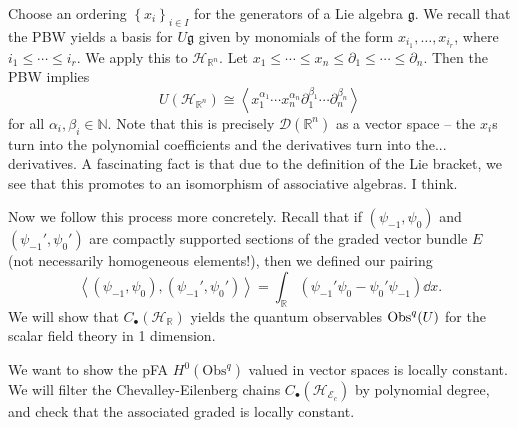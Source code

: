 Choose an ordering $\left\{ x_i \right\} _{i\in I} $ for the generators of a Lie algebra $\mathfrak{g} $. We recall that the PBW yields a basis for $U\mathfrak{g} $ given by monomials of the form $x_{i_1} ,\ldots ,x_{i_r} $, where $i_{1} \leq \cdots \leq i_{r} $. We apply this to $\mathcal{H} _{\mathbb{R} ^n} $. Let $x_1 \leq \cdots \leq x_n \leq \partial _1 \leq \cdots \leq \partial _n$. Then the PBW implies
\[
	U (\mathcal{H} _{\mathbb{R} ^n}) \cong \left\langle x_1^{\alpha _1} \cdots x_n^{\alpha _n} \partial _1^{\beta _1} \cdots \partial _n^{\beta _n}  \right\rangle 
\]
for all $\alpha_i,\beta _i\in\mathbb{N} $. Note that this is precisely $\mathscr{D} (\mathbb{R} ^n)$ as a vector space -- the $x_i$s turn into the polynomial coefficients and the derivatives turn into the... derivatives. A fascinating fact is that due to the definition of the Lie bracket, we see that this promotes to an isomorphism of associative algebras. I think.



Now we follow this process more concretely. Recall that if $(\psi _{-1} ,\psi _0)$ and $(\psi _{-1} ',\psi _0')$ are compactly supported sections of the graded vector bundle $E$ (not necessarily homogeneous elements!), then we defined our pairing
\[
	\left\langle (\psi _{-1} ,\psi _0),(\psi _{-1} ',\psi _0') \right\rangle = \int_{\mathbb{R} } \left(\psi _{-1} '\psi _0 - \psi _0'\psi _{-1} \right)\dd x
.\]
We will show that $C_{\bullet} (\mathcal{H} _{\mathbb{R} } )$ yields the quantum observables $\operatorname{Obs}^q(U)$ for the scalar field theory in 1 dimension.

We want to show the pFA $H^0(\mathrm{Obs} ^q)$ valued in vector spaces is locally constant. We will filter the Chevalley-Eilenberg chains $C_{\bullet} (\mathcal{H} _{\mathcal{E} _c} )$ by polynomial degree, and check that the associated graded is locally constant.

